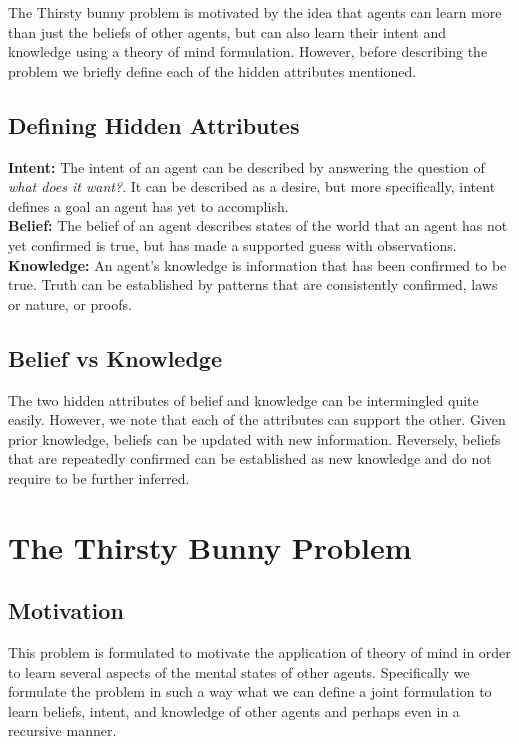 \documentclass[twocolumn]{article}
\begin{document}
 The Thirsty bunny problem is motivated by the idea that agents can learn more than just the beliefs of other agents, but can also learn their intent and knowledge using a theory of mind formulation. However, before describing the problem we briefly define each of the hidden attributes mentioned. 

\subsection{Defining Hidden Attributes}

\noindent \textbf{Intent:} The intent of an agent can be described by answering the question of \textit{what does it want?}. It can be described as a desire, but more specifically, intent defines a goal an agent has yet to accomplish. \\

\noindent \textbf{Belief:} The belief of an agent describes states of the world that an agent has not yet confirmed is true, but has made a supported guess with observations. \\

\noindent \textbf{Knowledge:} An agent's knowledge is information that has been confirmed to be true. Truth can be established by patterns that are consistently confirmed, laws or nature, or proofs. 

\subsection{Belief vs Knowledge} The two hidden attributes of belief and knowledge can be intermingled quite easily. However, we note that each of the attributes can support the other. Given prior knowledge, beliefs can be updated with new information. Reversely, beliefs that are repeatedly confirmed can be established as new knowledge and do not require to be further inferred. 

\section{The Thirsty Bunny Problem}

\subsection{Motivation}
This problem is formulated to motivate the application of theory of mind in order to learn several aspects of the mental states of other agents. Specifically we formulate the problem in such a way what we can define a joint formulation to learn beliefs, intent, and knowledge of other agents and perhaps even in a recursive manner. 
\end{document}
